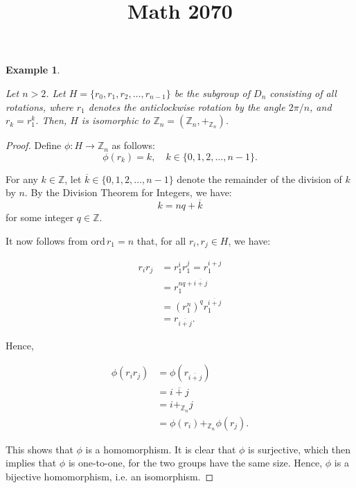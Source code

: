 \documentclass[a4paper,12pt]{report}
\newcommand{\ol}[1]{\overline{#1}}
\newcommand{\ra}{\longrightarrow}
\newcommand{\ord}{\mathrm{ord}\,}
\newcommand{\class}[2]{#2}
\renewcommand{\ord}{\mathrm{ord}\,}
\newcounter{statement}
\numberwithin{statement}{chapter}
\newtheorem{eg}[statement]{\bf Example}
\numberwithin{equation}{chapter}
\numberwithin{section}{chapter}
\numberwithin{subsection}{section}
\begin{document}
\begin{eg}
\label{eg:cycliczn}


Let $n > 2$.
Let $H = \{r_0, r_1, r_2, \ldots, r_{n - 1}\}$
be the subgroup of $D_n$ consisting of all rotations,
where $r_1$ denotes the anticlockwise rotation by the angle $2\pi/n$,
and $r_k = r_1^k$.
Then, $H$ is isomorphic to $\mathbb{Z}_n = (\mathbb{Z}_n, +_{\mathbb{Z}_n})$.
\end{eg}
\begin{proof}

Define $\phi: H \ra \mathbb{Z}_n$ as follows:
\[\phi(r_k) = k, \quad k \in \{0, 1, 2, \ldots, n - 1\}.\]




For any $k \in \mathbb{Z}$,
let $\ol{k} \in \{0, 1, 2, \ldots, n - 1\}$
denote the remainder of the division of $k$ by $n$.
By the Division Theorem for Integers, we have:
\[
k = nq + \ol{k}
\]
for some integer $q \in \mathbb{Z}$.




It now follows from $\ord r_1 = n$ that,
for all $r_i, r_j \in H$, we have:

\[\begin{split}
r_i r_j &= r_1^i r_1^j = r_1^{i + j}
\\&
\class{steps2 steps}{= r_1^{nq + \ol{i + j}}}
\\
&
\class{steps2 steps}{= \left(r_1^n\right)^q r_1^{\ol{i + j}}}
\\
&
\class{steps2 steps}{= r_{\ol{i + j}}.}
\end{split}\]





Hence,

\[\begin{split}
\phi(r_i r_j) &= \phi(r_{\ol{i + j}})
\\&
\class{steps3 steps}{= \ol{i + j}}
\\&
\class{steps3 steps}{= i +_{\mathbb{Z}_n} j}
\\&
\class{steps3 steps}{=\phi(r_i) +_{\mathbb{Z}_n} \phi(r_j).}
\end{split}\]


This shows that $\phi$ is a homomorphism.
It is clear that $\phi$ is surjective, which then implies that
$\phi$ is one-to-one, for the two groups have the same size.
Hence, $\phi$ is a bijective homomorphism, i.e. an isomorphism.


\end{proof}

$\newcommand{\ord}{\mathrm{ord}\,}$
\title{Math 2070}
\setcounter{chapter}{5}\setcounter{section}{0}
\setcounter{subsection}{0}
\setcounter{statement}{0}
\end{document}
